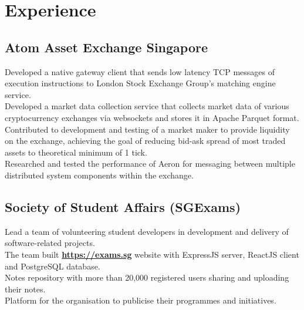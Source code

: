 \documentclass[a4paper,hidelinks]{resume} %
\begin{document}
\begin{minipage}[t]{0.55\textwidth} %

    
    \section{Experience}
    
    \sectionspace %
    
    \subsection{Atom Asset Exchange Singapore}
    
    \textbullet{} Developed a native gateway client that sends low latency TCP messages of execution instructions to London Stock Exchange Group’s matching engine service. \\
    \textbullet{} Developed a market data collection service that collects market data of various cryptocurrency exchanges via websockets and stores it in Apache Parquet format. \\
    \textbullet{} Contributed to development and testing of a market maker to provide liquidity on the exchange, achieving the goal of reducing bid-ask spread of most traded assets to theoretical minimum of 1 tick.\\
    \textbullet{} Researched and tested the performance of Aeron for messaging between multiple distributed system components within the exchange. \\
    
    \sectionspace %
    
    
    \subsection{Society of Student Affairs (SGExams)}
    
    \textbullet{} Lead a team of volunteering student developers in development and delivery of software-related projects. \\
    \textbullet{} The team built \href{https://exams.sg}{\bf https://exams.sg} website with ExpressJS server, ReactJS client and PostgreSQL database. \\
    \textbullet{} Notes repository with more than 20,000 registered users sharing and uploading their notes. \\
    \textbullet{} Platform for the organisation to publicise their programmes and initiatives. \\
    

\end{minipage}
\end{document}
